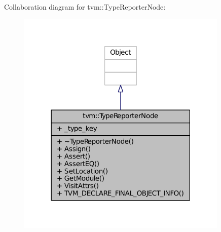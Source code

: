 Collaboration diagram for tvm\+:\+:Type\+Reporter\+Node\+:
\nopagebreak
\begin{figure}[H]
\begin{center}
\leavevmode
\includegraphics[width=285pt]{classtvm_1_1TypeReporterNode__coll__graph}
\end{center}
\end{figure}
